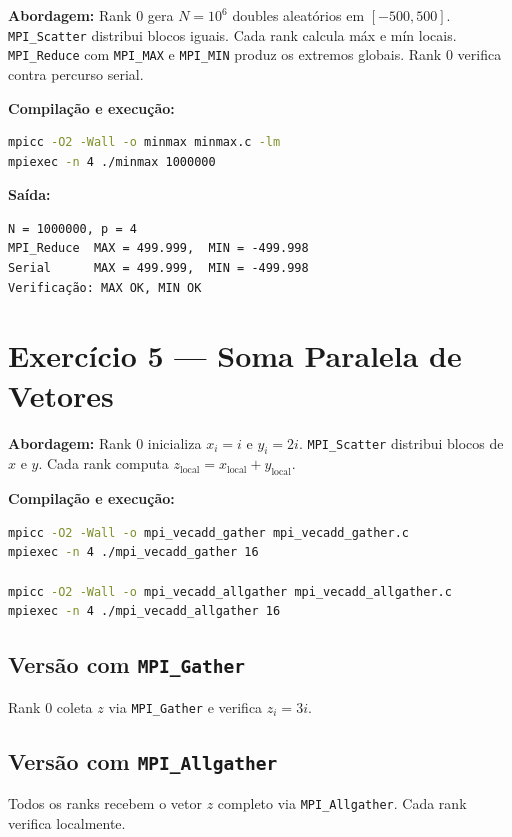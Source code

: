 \documentclass[10pt,small,a4paper]{article}
\begin{document}
\textbf{Abordagem:} Rank 0 gera $N = 10^6$ doubles aleatórios em $[-500, 500]$.
\texttt{MPI\_Scatter} distribui blocos iguais. Cada rank calcula máx e mín locais.
\texttt{MPI\_Reduce} com \texttt{MPI\_MAX} e \texttt{MPI\_MIN} produz os extremos
globais. Rank 0 verifica contra percurso serial.

\textbf{Compilação e execução:}
\begin{lstlisting}[language=bash,numbers=none]
mpicc -O2 -Wall -o minmax minmax.c -lm
mpiexec -n 4 ./minmax 1000000
\end{lstlisting}

\textbf{Saída:}
\begin{lstlisting}[language={},numbers=none]
N = 1000000, p = 4
MPI_Reduce  MAX = 499.999,  MIN = -499.998
Serial      MAX = 499.999,  MIN = -499.998
Verificação: MAX OK, MIN OK
\end{lstlisting}

\section{Exercício 5 — Soma Paralela de Vetores}

\textbf{Abordagem:} Rank 0 inicializa $x_i = i$ e $y_i = 2i$.
\texttt{MPI\_Scatter} distribui blocos de $x$ e $y$. Cada rank computa
$z_{\text{local}} = x_{\text{local}} + y_{\text{local}}$.

\textbf{Compilação e execução:}
\begin{lstlisting}[language=bash,numbers=none]
mpicc -O2 -Wall -o mpi_vecadd_gather mpi_vecadd_gather.c
mpiexec -n 4 ./mpi_vecadd_gather 16

mpicc -O2 -Wall -o mpi_vecadd_allgather mpi_vecadd_allgather.c
mpiexec -n 4 ./mpi_vecadd_allgather 16
\end{lstlisting}

\subsection{Versão com \texttt{MPI\_Gather}}
Rank 0 coleta $z$ via \texttt{MPI\_Gather} e verifica $z_i = 3i$.

\subsection{Versão com \texttt{MPI\_Allgather}}
Todos os ranks recebem o vetor $z$ completo via \texttt{MPI\_Allgather}.
Cada rank verifica localmente.
\end{document}

